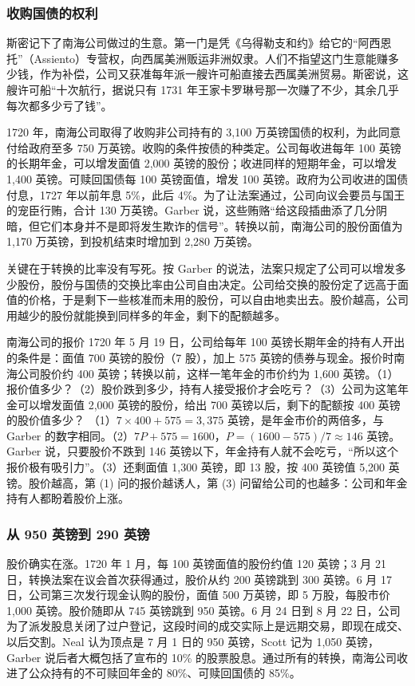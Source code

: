 \subsubsection{收购国债的权利}
斯密记下了南海公司做过的生意。第一门是凭《乌得勒支和约》给它的“阿西恩托”（Assiento）专营权，向西属美洲贩运非洲奴隶。人们不指望这门生意能赚多少钱，作为补偿，公司又获准每年派一艘许可船直接去西属美洲贸易。斯密说，这艘许可船“十次航行，据说只有 1731 年王家卡罗琳号那一次赚了不少，其余几乎每次都多少亏了钱”\cite{smith1776}。

1720 年，南海公司取得了收购非公司持有的 3,100 万英镑国债的权利，为此同意付给政府至多 750 万英镑。收购的条件按债的种类定。公司每收进每年 100 英镑的长期年金，可以增发面值 2,000 英镑的股份；收进同样的短期年金，可以增发 1,400 英镑。可赎回国债每 100 英镑面值，增发 100 英镑。政府为公司收进的国债付息，1727 年以前年息 5\%，此后 4\%\cite{garber1990}。为了让法案通过，公司向议会要员与国王的宠臣行贿，合计 130 万英镑。Garber 说，这些贿赂“给这段插曲添了几分阴暗，但它们本身并不是即将发生欺诈的信号”\cite{garber1990}。转换以前，南海公司的股份面值为 1,170 万英镑，到投机结束时增加到 2,280 万英镑\cite{garber1990}。

关键在于转换的比率没有写死。按 Garber 的说法，法案只规定了公司可以增发多少股份，股份与国债的交换比率由公司自由决定。公司给交换的股份定了远高于面值的价格，于是剩下一些核准而未用的股份，可以自由地卖出去\cite{garber1990}。股价越高，公司用越少的股份就能换到同样多的年金，剩下的配额越多。

\begin{example}{南海公司的报价}\label{ex:merc-offer}
1720 年 5 月 19 日，公司给每年 100 英镑长期年金的持有人开出的条件是：面值 700 英镑的股份（7 股），加上 575 英镑的债券与现金。报价时南海公司股价约 400 英镑；转换以前，这样一笔年金的市价约为 1,600 英镑\cite{garber1990}。（1）报价值多少？（2）股价跌到多少，持有人接受报价才会吃亏？（3）公司为这笔年金可以增发面值 2,000 英镑的股份，给出 700 英镑以后，剩下的配额按 400 英镑的股价值多少？
\solution （1）$7\times400+575=3{,}375$ 英镑，是年金市价的两倍多，与 Garber 的数字相同。（2）$7P+575=1600$，$P=(1600-575)/7\approx146$ 英镑。Garber 说，只要股价不跌到 146 英镑以下，年金持有人就不会吃亏，“所以这个报价极有吸引力”\cite{garber1990}。（3）还剩面值 1,300 英镑，即 13 股，按 400 英镑值 5,200 英镑。股价越高，第 (1) 问的报价越诱人，第 (3) 问留给公司的也越多：公司和年金持有人都盼着股价上涨。
\end{example}

\subsubsection{从 950 英镑到 290 英镑}
股价确实在涨。1720 年 1 月，每 100 英镑面值的股份约值 120 英镑；3 月 21 日，转换法案在议会首次获得通过，股价从约 200 英镑跳到 300 英镑\cite{garber1990}。6 月 17 日，公司第三次发行现金认购的股份，面值 500 万英镑，即 5 万股，每股市价 1,000 英镑。股价随即从 745 英镑跳到 950 英镑\cite{garber1990}。6 月 24 日到 8 月 22 日，公司为了派发股息关闭了过户登记，这段时间的成交实际上是远期交易，即现在成交、以后交割。Neal 认为顶点是 7 月 1 日的 950 英镑，Scott 记为 1,050 英镑，Garber 说后者大概包括了宣布的 10\% 的股票股息\cite{garber1990}。通过所有的转换，南海公司收进了公众持有的不可赎回年金的 80\%、可赎回国债的 85\%\cite{garber1990}。

